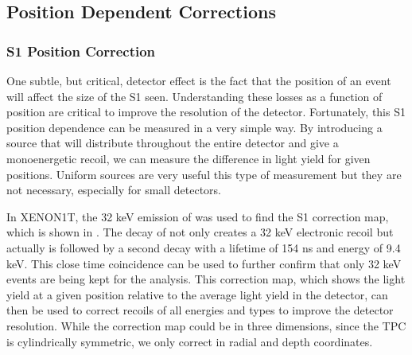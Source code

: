 \subsection{Position Dependent Corrections}
\label{sec:xe1t_pos_dependent_corrections}

\subsubsection{S1 Position Correction}
\label{sec:xe1t_lce_pos_correction}

One subtle, but critical, detector effect is the fact that the position of an event will affect the size of the S1 seen.  Understanding these losses as a function of position are critical to improve the resolution of the detector.  Fortunately, this S1 position dependence can be measured in a very simple way.  By introducing a source that will distribute throughout the entire detector and give a monoenergetic recoil, we can measure the difference in light yield for given positions.  Uniform sources are very useful this type of measurement but they are not necessary, especially for small detectors.

In XENON1T, the 32 keV emission of  was used to find the S1 correction map, which is shown in .  The decay of  not only creates a 32 keV electronic recoil but actually is followed by a second decay with a lifetime of 154 ns and energy of 9.4 keV.  This close time coincidence can be used to further confirm that only 32 keV events are being kept for the analysis.  This correction map, which shows the light yield at a given position relative to the average light yield in the detector, can then be used to correct recoils of all energies and types to improve the detector resolution.  While the correction map could be in three dimensions, since the TPC is cylindrically symmetric, we only correct in radial and depth coordinates.



